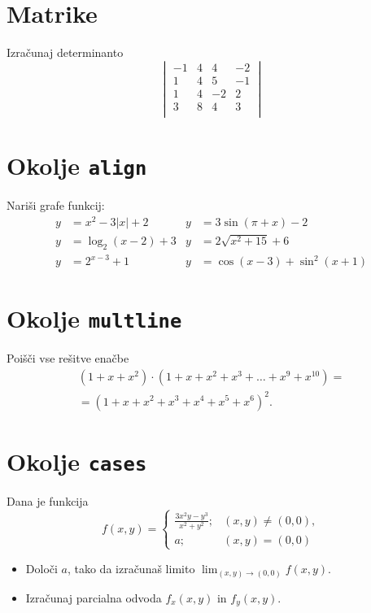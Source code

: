 \documentclass[a4paper,12pt]{article}
\begin{document}
\section*{Matrike}
Izračunaj determinanto
\[
\begin{vmatrix}
   -1 & 4 & 4 & -2 \\
   1 & 4 & 5 & -1 \\
   1 & 4 & -2 & 2 \\
   3 & 8 & 4 & 3 \\
\end{vmatrix}
\]
\section*{Okolje \texttt{align}}
Nariši grafe funkcij:
\begin{align*}
y &= x^2 - 3|x| + 2   & y &= 3 \sin(\pi+x) - 2\\
y &= \log_2(x-2) + 3  & y &= 2 \sqrt{x^2+15} + 6\\
y &= 2^{x-3} + 1      & y &= \cos(x-3) + \sin^2(x+1)
\end{align*}

\section*{Okolje \texttt{multline}}
Poišči vse rešitve enačbe
\begin{multline*}
(1+x+x^2) \cdot (1+x+x^2+x^3+\ldots+x^9+x^{10}) = \\
=(1+x+x^2+x^3+x^4+x^5+x^6)^2.
\end{multline*}

\section*{Okolje \texttt{cases}}
Dana je funkcija
\[
f(x,y)=
\begin{cases}
   \frac{3x^2y-y^3}{x^2+y^2}; & (x,y) \neq (0,0), \\
   a; & (x,y) = (0,0)
\end{cases}
\]

\begin{itemize}
\item Določi \(a\), tako da izračunaš limito \( \lim_{(x,y)\to(0,0)} f(x,y) \).
\item Izračunaj parcialna odvoda \(f_x(x,y)\) in \(f_y(x,y)\).
\end{itemize}
\end{document}
